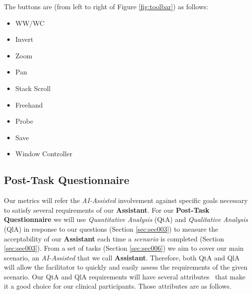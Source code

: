 
\hfill

The buttons are (from left to right of Figure \ref{fig:toolbar}) as follows:

\hfill

\begin{itemize}
\item WW/WC
\item Invert
\item Zoom
\item Pan
\item Stack Scroll
\item Freehand
\item Probe
\item Save
\item Window Controller
\end{itemize}

\hfill

\clearpage

























\subsection{Post-Task Questionnaire}

Our metrics will refer the \textit{AI-Assisted} involvement against specific goals necessary to satisfy several requirements of our \textbf{Assistant}. For our \textbf{Post-Task Questionnaire} we will use \textit{Quantitative Analysis} (QtA) and \textit{Qualitative Analysis} (QlA) in response to our questions (Section \ref{sec:sec003}) to measure the acceptability of our \textbf{Assistant} each time a \textit{scenario} is completed (Section \ref{sec:sec003}). From a set of tasks (Section \ref{sec:sec006}) we aim to cover our main scenario, an \textit{AI-Assisted} that we call \textbf{Assistant}. Therefore, both QtA and QlA will allow the facilitator to quickly and easily assess the requirements of the given scenario. Our QtA and QlA requirements will have several attributes~\cite{joyce2017healthcare} that make it a good choice for our clinical participants. Those attributes are as follows.

